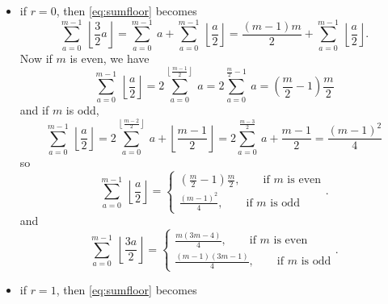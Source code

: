 \documentclass[a4paper,10pt]{article}
\begin{document}
        \begin{itemize}
            \item if $r=0$, then \eqref{eq:sumfloor} becomes
            \begin{equation}
                \sum^{m-1}_{a=0}~\left\lfloor \frac{3}{2}a\right\rfloor = \sum^{m-1}_{a=0}~a+\sum^{m-1}_{a=0}~\left\lfloor \frac{a}{2}\right\rfloor = \frac{(m-1)m}{2}+\sum^{m-1}_{a=0}~\left\lfloor \frac{a}{2}\right\rfloor.
            \end{equation}
            Now if $m$ is even, we have
            \begin{equation}
                \sum^{m-1}_{a=0}~\left\lfloor \frac{a}{2}\right\rfloor = 2\sum^{\left\lfloor \frac{m-1}{2}\right\rfloor}_{a=0}~a = 2\sum^{\frac{m}{2}-1}_{a=0}~a = \left(\frac{m}{2}-1\right)\frac{m}{2}
            \end{equation}
            and if $m$ is odd,
            \begin{equation}
                \sum^{m-1}_{a=0}~\left\lfloor \frac{a}{2}\right\rfloor = 2\sum^{\left\lfloor \frac{m-2}{2}\right\rfloor}_{a=0}~a+\left\lfloor \frac{m-1}{2}\right\rfloor = 2\sum^{ \frac{m-3}{2}}_{a=0}~a+\frac{m-1}{2} = \frac{(m-1)^2}{4}
            \end{equation}
            so
            \begin{equation}
                \sum^{m-1}_{a=0}~\left\lfloor \frac{a}{2}\right\rfloor = 
                \begin{cases}
                    \left(\frac{m}{2}-1\right)\frac{m}{2},\qquad\text{if $m$ is even}\\
                    \frac{(m-1)^2}{4},\qquad\text{if $m$ is odd}
                \end{cases}.\label{eq:suma2floor}
            \end{equation}
            and
            \begin{equation}
                \sum^{m-1}_{a=0}~\left\lfloor \frac{3a}{2}\right\rfloor = 
                \begin{cases}
                    \frac{m(3m-4)}{4},\qquad\text{if $m$ is even}\\
                    \frac{(m-1)(3m-1)}{4},\qquad\text{if $m$ is odd}
                \end{cases}.\label{eq:sum3a2floor}
            \end{equation}
            \item if $r=1$, then \eqref{eq:sumfloor} becomes
            \begin{equation}

\end{equation}
\end{itemize}
\end{document}
